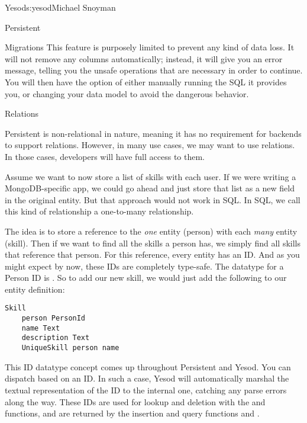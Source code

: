 \begin{aosachapter}{Yesod}{s:yesod}{Michael Snoyman}
\begin{aosasect1}{Persistent}
\begin{aosasect2}{Migrations}
This feature is purposely limited to prevent any kind of data loss. It
will not remove any columns automatically; instead, it will give you
an error message, telling you the unsafe operations that are necessary
in order to continue. You will then have the option of either manually
running the SQL it provides you, or changing your data model to avoid the
dangerous behavior.

\end{aosasect2}

\begin{aosasect2}{Relations}

Persistent is non-relational in nature, meaning it has no requirement
for backends to support relations. However, in many use cases, we may
want to use relations. In those cases, developers will have full
access to them.

Assume we want to now store a list of skills with each user. If we
were writing a MongoDB-specific app, we could go ahead and just store
that list as a new field in the original  entity. But that
approach would not work in SQL. In SQL, we call this kind of
relationship a one-to-many relationship.

The idea is to store a reference to the \emph{one} entity (person) with
each \emph{many} entity (skill). Then if we want to find all the skills a
person has, we simply find all skills that reference that person. For
this reference, every entity has an ID. And as you might expect by
now, these IDs are completely type-safe. The datatype for a Person ID
is . So to add our new skill, we would just add the
following to our entity definition:

\begin{verbatim}
Skill
    person PersonId
    name Text
    description Text
    UniqueSkill person name
\end{verbatim}

This ID datatype concept comes up throughout Persistent and Yesod. You
can dispatch based on an ID. In such a case, Yesod will automatically
marshal the textual representation of the ID to the internal one,
catching any parse errors along the way. These IDs are used for lookup
and deletion with the  and  functions, and are
returned by the insertion and query functions  and
.

\end{aosasect2}

\end{aosasect1}


\end{aosachapter}
